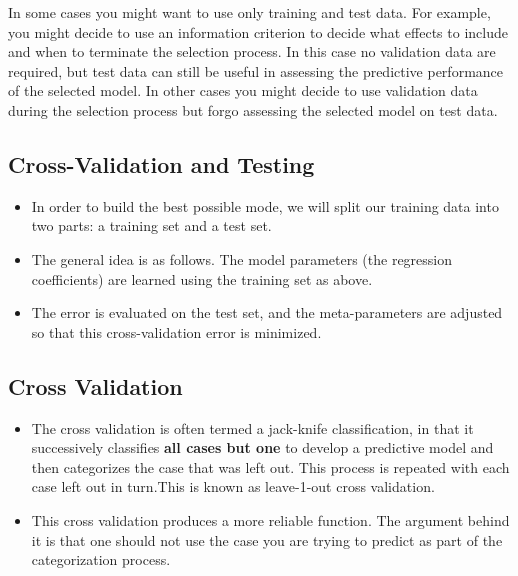 \documentclass[a4paper,12pt]{article}
\begin{document}
In some cases you might want to use only training and test data. For example, you might decide to use an information criterion to decide what effects to include and when to terminate the selection process. In this case no validation data are required, but test data can still be useful in assessing the predictive performance of the selected model. In other cases you might decide to use validation data during the selection process but forgo assessing the selected model on test data. 

	

\subsection{Cross-Validation and Testing}
\begin{itemize}
	\item In order to build the best possible mode, we will split our training data into two parts: a training set and a test set. 
	
	\item 	The general idea is as follows. The model parameters (the regression coefficients) are learned using the training set as above. 
	\item The error is evaluated on the test set, and the meta-parameters are adjusted so that this cross-validation error is minimized. 
	
\end{itemize}	
\subsection{Cross Validation}
\begin{itemize}	
	\item The cross validation is often termed a jack-knife classification, in that
	it successively classifies \textbf{all cases but one} to develop a predictive model and then
	categorizes the case that was left out. This process is repeated with each case left out in
	turn.This is known as leave-1-out cross validation. 
	
	\item 	This cross validation produces a more reliable function. The argument behind it is that
	one should not use the case you are trying to predict as part of the categorization process.
\end{itemize}
\end{document}
